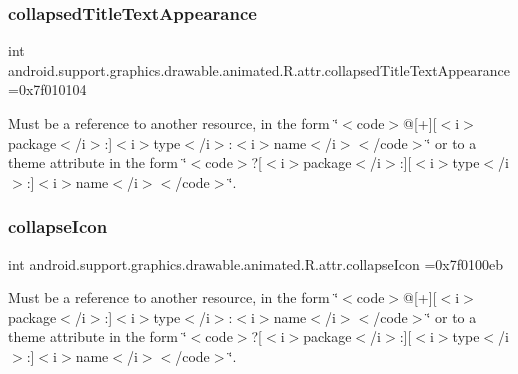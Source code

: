 \subsubsection{\texorpdfstring{collapsed\+Title\+Text\+Appearance}{collapsedTitleTextAppearance}}
{\footnotesize\ttfamily int android.\+support.\+graphics.\+drawable.\+animated.\+R.\+attr.\+collapsed\+Title\+Text\+Appearance =0x7f010104\hspace{0.3cm}{\ttfamily [static]}}

Must be a reference to another resource, in the form \char`\"{}$<$code$>$@\mbox{[}+\mbox{]}\mbox{[}$<$i$>$package$<$/i$>$\+:\mbox{]}$<$i$>$type$<$/i$>$\+:$<$i$>$name$<$/i$>$$<$/code$>$\char`\"{} or to a theme attribute in the form \char`\"{}$<$code$>$?\mbox{[}$<$i$>$package$<$/i$>$\+:\mbox{]}\mbox{[}$<$i$>$type$<$/i$>$\+:\mbox{]}$<$i$>$name$<$/i$>$$<$/code$>$\char`\"{}. \mbox{\label{classandroid_1_1support_1_1graphics_1_1drawable_1_1animated_1_1R_1_1attr_a0fcc55024c49201a4067853f24c51f85}} 
\subsubsection{\texorpdfstring{collapse\+Icon}{collapseIcon}}
{\footnotesize\ttfamily int android.\+support.\+graphics.\+drawable.\+animated.\+R.\+attr.\+collapse\+Icon =0x7f0100eb\hspace{0.3cm}{\ttfamily [static]}}

Must be a reference to another resource, in the form \char`\"{}$<$code$>$@\mbox{[}+\mbox{]}\mbox{[}$<$i$>$package$<$/i$>$\+:\mbox{]}$<$i$>$type$<$/i$>$\+:$<$i$>$name$<$/i$>$$<$/code$>$\char`\"{} or to a theme attribute in the form \char`\"{}$<$code$>$?\mbox{[}$<$i$>$package$<$/i$>$\+:\mbox{]}\mbox{[}$<$i$>$type$<$/i$>$\+:\mbox{]}$<$i$>$name$<$/i$>$$<$/code$>$\char`\"{}. \mbox{\label{classandroid_1_1support_1_1graphics_1_1drawable_1_1animated_1_1R_1_1attr_a1d57c156fe8a7b2edea82f71d9305738}} 
